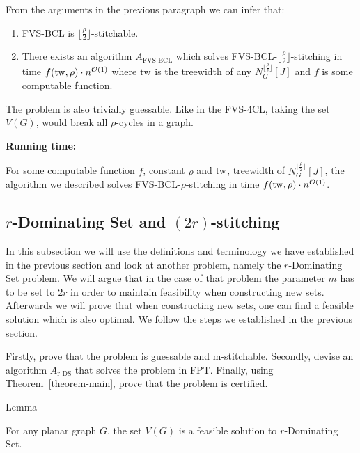 From the arguments in the previous paragraph we can infer that:

\begin{enumerate}
    \item FVS-BCL is $\lfloor\frac{\rho}{2}\rfloor$-stitchable.
    \item There exists an algorithm $A_{\text{FVS-BCL}}$ which solves 
    FVS-BCL-$\lfloor\frac{\rho}{2}\rfloor$-stitching in time 
    $f(\operatorname{tw}, \rho) \cdot n^{\mathcal{O}(1)}$ 
    where $\operatorname{tw}$ is the treewidth of any $N^{\lfloor\frac{\rho}{2}\rfloor}_{G}[J]$ and 
    $f$ is some computable function.
\end{enumerate}

The problem is also trivially guessable. Like in the FVS-4CL, taking the set $V(G)$, would 
break all $\rho$-cycles in a graph.

\textbf{Running time:}

For some computable function $f$, constant $\rho$ and $\operatorname{tw}$, treewidth of 
$N^{\lfloor\frac{\rho}{2}\rfloor}_{G}[J]$,
the algorithm we described solves 
FVS-BCL-$\rho$-stitching in time $f(\operatorname{tw}, \rho) \cdot n^{\mathcal{O}(1)}$.

\subsection{$r$-Dominating Set and $(2r)$-stitching}

In this subsection we will use the definitions and terminology we have established in the 
previous section and look at another problem, namely the $r$-Dominating Set problem. We will 
argue that in the case of that problem the parameter $m$ has to be set to $2r$ in order 
to maintain feasibility when constructing new sets. Afterwards we will prove that 
when constructing new sets, one can find a feasible solution which is also optimal. 
We follow the steps we established in the previous section.

Firstly, prove that the problem is guessable and m-stitchable. Secondly, devise an algorithm 
$A_{\text{r-DS}}$ that solves the problem in FPT. Finally, using Theorem~\ref{theorem-main}, 
prove that the problem is certified.

\begin{mydefinition}{Lemma}
    \label{lemma-ds-guessable}

    For any planar graph $G$, the set $V(G)$ is a feasible solution to $r$-Dominating Set.

\end{mydefinition}

